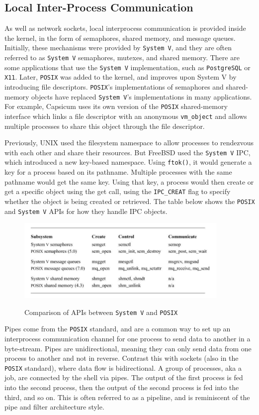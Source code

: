 \documentclass[12pt, dvipsnames, a4paper]{article}
\newcommand{\code}[1]{\texttt{#1}}
\begin{document}
\subsection{Local Inter-Process Communication}
As well as network sockets, local interprocess communication is provided inside the kernel, in the form of semaphores, shared memory, and message queues. Initially, these mechanisms were provided by \code{System V}, and they are often referred to as \code{System V} semaphores, mutexes, and shared memory. There are some applications that use the \code{System V} implementation, such as \code{PostgreSQL} or \code{X11}. Later, \code{POSIX} was added to the kernel, and improves upon System V by introducing file descriptors. \code{POSIX}’s implementations of semaphores and shared-memory objects have replaced \code{System V}’s implementations in many applications. For example, Capsicum uses its own version of the \code{POSIX} shared-memory interface which links a file descriptor with an anonymous \code{vm\_object} and allows multiple processes to share this object through the file descriptor.

Previously, UNIX used the filesystem namespace to allow processes to rendezvous with each other and share their resources. But FreeBSD used the \code{System V} IPC, which introduced a new key-based namespace. Using \code{ftok()}, it would generate a key for a process based on its pathname. Multiple processes with the same pathname would get the same key. Using that key, a process would then create or get a specific object using the get call, using the \code{IPC\_CREAT} flag to specify whether the object is being created or retrieved. The table below shows the \code{POSIX} and \code{System V} APIs for how they handle IPC objects.

\begin{figure}[hbt!]
	\centering
	\includegraphics[width=290pt]{assets/localipc1.png}
	\caption{Comparison of APIs between \code{System V} and \code{POSIX}} \cite{mckusick}
\end{figure}

Pipes come from the \code{POSIX} standard, and are a common way to set up an interprocess communication channel for one process to send data to another in a byte-stream. Pipes are unidirectional, meaning they can only send data from one process to another and not in reverse. Contrast this with sockets (also in the \code{POSIX} standard), where data flow is bidirectional. A group of processes, aka a job, are connected by the shell via pipes. The output of the first process is fed into the second process, then the output of the second process is fed into the third, and so on. This is often referred to as a pipeline, and is reminiscent of the pipe and filter architecture style.
\end{document}
